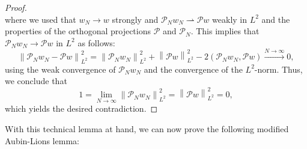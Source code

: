 \documentclass[10pt,letterpaper]{amsart}
\newcommand\norm[1]{\left\lVert#1\right\rVert}
\newcommand{\weak}{\rightharpoonup}
\newcommand{\PN}{\mathcal{P}_{N}}
\newcommand{\Pl}{\mathcal{P}} %
\theoremstyle{definition}{\newtheorem{definition}[lemma]{Definition}}
\numberwithin{equation}{section}
\begin{document}
\begin{proof}
\begin{equation*}
	\end{equation*}
	where we used that $w_N\to w$ strongly and $\PN w_N\weak \Pl w$ weakly in $L^2$ and the properties of the orthogonal projections $\Pl$ and $\PN$. This implies that $\PN w_N\to \Pl w$ in $L^2$ as follows:
	\begin{equation*}
		\norm{\PN w_N - \Pl w}_{L^2}^2 = \norm{\PN w_N}_{L^2}^2 + \norm{\Pl w}_{L^2}^2 - 2(\PN w_N, \Pl w)\stackrel{N\to \infty}{\longrightarrow} 0,
	\end{equation*}
	using the weak convergence of $\PN w_N$ and the convergence of the $L^2$-norm. Thus, we conclude that 
	\begin{equation*}
		1=\lim_{N\to \infty}	\norm{\PN w_N}_{L^2}^2 =\norm{\Pl w}_{L^2}^2=0,
	\end{equation*}
	which yields the desired contradiction.
\end{proof}

With this technical lemma at hand, we can now prove the following modified Aubin-Lions lemma:
\end{document}
